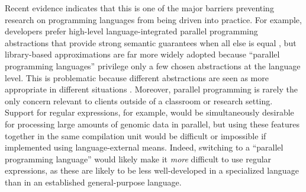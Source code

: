 
Recent evidence indicates that this is one of the major barriers preventing research on programming languages from being driven into practice. For example, developers prefer high-level language-integrated parallel programming abstractions that provide  strong semantic guarantees when all else is equal \cite{cave2010comparing}, but library-based approximations are far more widely adopted because  ``parallel programming languages'' privilege only a few chosen  abstractions at the language level. This is problematic because different abstractions are seen as more appropriate in different situations \cite{Tasharofi:2013rc}. Moreover,  parallel programming is rarely the only concern relevant to clients outside of a classroom or research setting. Support for regular expressions, for example, would be simultaneously desirable for processing large amounts of genomic data in parallel, but using these features together in the same compilation unit would be difficult or impossible if implemented using language-external means. Indeed, switching to a ``parallel programming language'' would likely make it \emph{more} difficult to use regular expressions, as these are likely to be less well-developed in a specialized language than in an established general-purpose language.%


